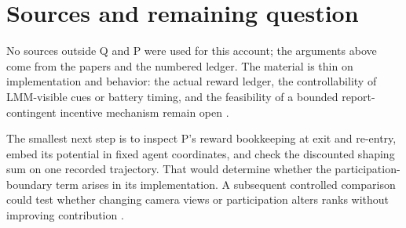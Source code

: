 \documentclass{article}
\begin{document}
\section*{Sources and remaining question}

No sources outside Q and P were used for this account; the arguments above come from the papers and the numbered ledger. The material is thin on implementation and behavior: the actual reward ledger, the controllability of LMM-visible cues or battery timing, and the feasibility of a bounded report-contingent incentive mechanism remain open .

The smallest next step is to inspect P's reward bookkeeping at exit and re-entry, embed its potential in fixed agent coordinates, and check the discounted shaping sum on one recorded trajectory. That would determine whether the participation-boundary term arises in its implementation. A subsequent controlled comparison could test whether changing camera views or participation alters ranks without improving contribution .
\end{document}

